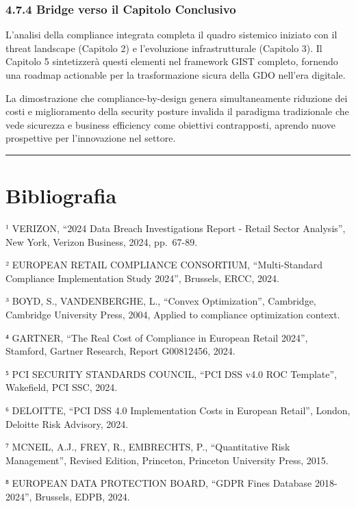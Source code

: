 \documentclass{report}
\begin{document}
\subsubsection{4.7.4 Bridge verso il Capitolo
Conclusivo}\label{bridge-verso-il-capitolo-conclusivo}

L'analisi della compliance integrata completa il quadro sistemico
iniziato con il threat landscape (Capitolo 2) e l'evoluzione
infrastrutturale (Capitolo 3). Il Capitolo 5 sintetizzerà questi
elementi nel framework GIST completo, fornendo una roadmap actionable
per la trasformazione sicura della GDO nell'era digitale.

La dimostrazione che compliance-by-design genera simultaneamente
riduzione dei costi e miglioramento della security posture invalida il
paradigma tradizionale che vede sicurezza e business efficiency come
obiettivi contrapposti, aprendo nuove prospettive per l'innovazione nel
settore.

\begin{center}\rule{0.5\linewidth}{0.5pt}\end{center}

\section{Bibliografia}\label{bibliografia-1}

¹ VERIZON, ``2024 Data Breach Investigations Report - Retail Sector
Analysis'', New York, Verizon Business, 2024, pp.~67-89.

² EUROPEAN RETAIL COMPLIANCE CONSORTIUM, ``Multi-Standard Compliance
Implementation Study 2024'', Brussels, ERCC, 2024.

³ BOYD, S., VANDENBERGHE, L., ``Convex Optimization'', Cambridge,
Cambridge University Press, 2004, Applied to compliance optimization
context.

⁴ GARTNER, ``The Real Cost of Compliance in European Retail 2024'',
Stamford, Gartner Research, Report G00812456, 2024.

⁵ PCI SECURITY STANDARDS COUNCIL, ``PCI DSS v4.0 ROC Template'',
Wakefield, PCI SSC, 2024.

⁶ DELOITTE, ``PCI DSS 4.0 Implementation Costs in European Retail'',
London, Deloitte Risk Advisory, 2024.

⁷ MCNEIL, A.J., FREY, R., EMBRECHTS, P., ``Quantitative Risk
Management'', Revised Edition, Princeton, Princeton University Press,
2015.

⁸ EUROPEAN DATA PROTECTION BOARD, ``GDPR Fines Database 2018-2024'',
Brussels, EDPB, 2024.
\end{document}

